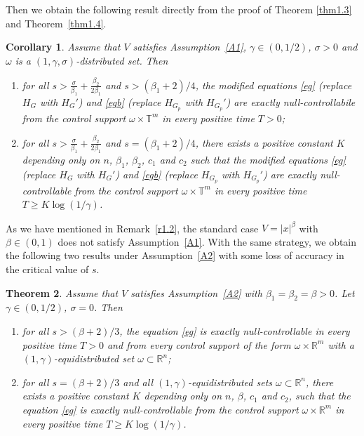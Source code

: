 \documentclass{article}
\numberwithin{equation}{section}
\newcommand\R{\ensuremath{\mathbb{R}}}
\newcommand\T{\ensuremath{\mathbb{T}}}
\newtheorem{theorem}{Theorem}[section]
\newtheorem{corollary}[theorem]{Corollary}
\numberwithin{equation}{section}
\theoremstyle{definition}
\begin{document}
Then we obtain the following result directly from the proof of Theorem \ref{thm1.3} and Theorem~\ref{thm1.4}.
\begin{corollary}\label{crc1.5}
	Assume that $V$ satisfies Assumption~\ref{A1}, $\gamma \in (0,1 /2)$, $\sigma >0$ and $\omega$ is a $(1,\gamma,\sigma )$-distributed set. Then 
	\begin{enumerate}
		\item for all $s>\frac{\sigma }{\beta_1}+\frac{\beta_2}{2\beta_1}$ and  $s > (\beta_1+2)/4$, the modified equations \eqref{eg} (replace $H_{G}$ with  $H_{G}'$) and \eqref{egb} (replace $H_{G_p}$ with $H_{G_p}'$) are exactly null-controllabile from the control support $\omega \times \T^{m}$ in every positive time $T>0$;
		\item for all $s> \frac{\sigma }{\beta_1}+\frac{\beta_2}{2\beta_1}$ and $ s=(\beta_1+2) /4$, there exists a positive constant $K$ depending only on $n$, $\beta_1$, $\beta_2$, $c_1$ and $c_2$ such that the modified equations \eqref{eg} (replace $H_{G}$ with $H_{G}'$) and \eqref{egb} (replace $H_{G_p}$ with $H_{G_p}'$) are exactly null-controllable from the control support $\omega\times \T^{m}$ in every positive time $T\ge K \log(1 /\gamma)$.
	\end{enumerate}
\end{corollary}

As we have mentioned in Remark~\ref{r1.2}, the standard case $V=|x|^{\beta}$ with $\beta \in (0,1)$ does not satisfy Assumption~\ref{A1}. With the same strategy, we obtain the following two results under Assumption~\ref{A2} with some loss of accuracy in the critical value of $s$.

\begin{theorem}\label{thm1.4g}
	Assume that $V$ satisfies Assumption~\ref{A2} with $\beta_1=\beta_2=\beta >0$. Let $\gamma \in (0,1 /2)$, $\sigma = 0$. Then
	\begin{enumerate}
		\item for all $s>(\beta+2) /3$, the equation \eqref{eg} is exactly null-controllable in every positive time $T>0$ and from every control support of the form $\omega \times \R^{m}$ with a $(1,\gamma)$-equidistributed set $\omega\subset \R^{n}$;
		\item for all $s= (\beta+2) /3$ and all $(1,\gamma)$-equidistributed sets $\omega \subset \R^{n}$, there exists a positive constant $K$ depending only on  $n$, $\beta$, $c_1$ and $c_2$, such that the equation \eqref{eg} is exactly null-controllable from the control support $\omega\times \R^{m}$ in every positive time $T\ge K \log(1 /\gamma)$.
	\end{enumerate}
\end{theorem}
\end{document}

